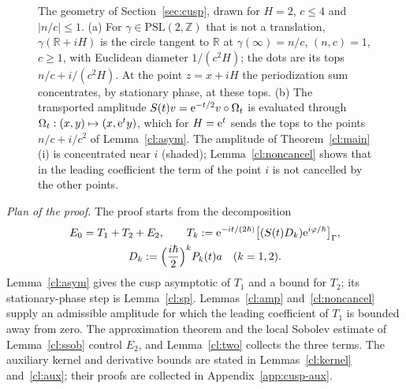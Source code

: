 \begin{figure}[tb]
\centering\footnotesize
{}
\caption{The geometry of Section~\ref{sec:cusp}, drawn for $H=2$, $c\le4$ and $|n/c|\le1$. (a) For $\gamma\in\mathrm{PSL}(2,\mathbb Z)$
that is not a translation, $\gamma(\mathbb R+iH)$ is the circle tangent to $\mathbb R$ at $\gamma(\infty)=n/c$, $(n,c)=1$, $c\ge1$, with
Euclidean diameter $1/(c^2H)$; the dots are its tops $n/c+i/(c^2H)$. At the point $z=x+iH$ the periodization sum concentrates, by
stationary phase, at these tops. (b) The transported amplitude $S(t)v=\mathrm{e}^{-t/2}v\circ\Omega_t$ is evaluated through
$\Omega_t:(x,y)\mapsto(x,\mathrm{e}^ty)$, which for $H=\mathrm{e}^t$ sends the tops to the points $n/c+i/c^2$ of Lemma~\ref{cl:asym}. The amplitude of
Theorem~\ref{cl:main}(i) is concentrated near $i$ (shaded); Lemma~\ref{cl:noncancel} shows that in the leading coefficient the term of
the point $i$ is not cancelled by the other points.}\label{fig:cusp}
\end{figure}

\medskip\noindent\emph{Plan of the proof.} The proof starts from the decomposition
\[
\begin{gathered}
 E_0=T_1+T_2+E_2,\qquad
 T_k:=\mathrm{e}^{-it/(2\hbar)}\bigl[(S(t)D_k)\mathrm{e}^{i\varphi/\hbar}\bigr]_\Gamma,\\
 D_k:=\Bigl(\frac{i\hbar}{2}\Bigr)^kP_k(t)a\quad(k=1,2).
\end{gathered}
\]
Lemma~\ref{cl:asym} gives the cusp asymptotic of $T_1$ and a bound for $T_2$; its stationary-phase step is
Lemma~\ref{cl:sp}. Lemmas~\ref{cl:amp} and~\ref{cl:noncancel} supply an admissible amplitude for which the leading
coefficient of $T_1$ is bounded away from zero. The approximation theorem and the local
Sobolev estimate of Lemma~\ref{cl:ssob} control $E_2$, and Lemma~\ref{cl:two} collects the three terms.
The auxiliary kernel and derivative bounds are stated in Lemmas~\ref{cl:kernel} and~\ref{cl:aux};
their proofs are collected in Appendix~\ref{app:cusp-aux}.

